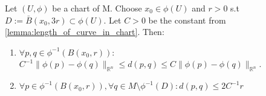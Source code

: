 \begin{lemma}
    Let $(U, \phi)$ be a chart of M.
    Choose $x_0 \in \phi(U)$ and $r>0$ s.t $D := \bar{B}(x_0, 3r) \subset \phi(U)$.
    Let $C>0$ be the constant from \autoref{lemma:length_of_curve_in_chart}. Then:
    \begin{enumerate}
        \item $\forall p,q \in \phi^{-1}({B}(x_0, r))$: \\
        $C^{-1} \| \phi(p) - \phi(q) \|_{\mathbb{R}^n} \leq d(p,q) \leq C \|\phi(p) - \phi(q)\|_{\mathbb{R}^n}$.
        \item $\forall p \in \phi^{-1}({B}(x_0, r)), \forall q \in M \setminus \phi^{-1}(D) : d(p,q) \leq 2C^{-1}r$
    \end{enumerate}
    \label{lemma:distance_in_chart}
\end{lemma}



